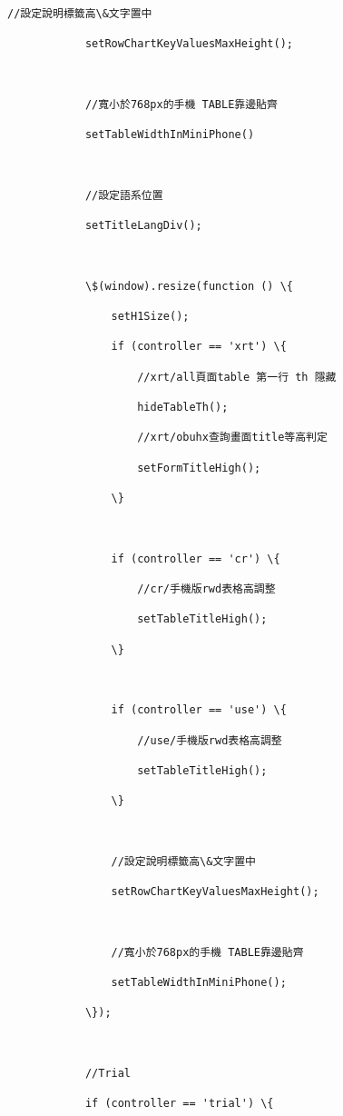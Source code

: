 \documentclass[11pt]{article}
\begin{document}
\begin{Verbatim}[commandchars=\\\{\}]
            //設定說明標籤高\&文字置中

            setRowChartKeyValuesMaxHeight();



            //寬小於768px的手機 TABLE靠邊貼齊

            setTableWidthInMiniPhone()



            //設定語系位置

            setTitleLangDiv();



            \$(window).resize(function () \{

                setH1Size();

                if (controller == 'xrt') \{

                    //xrt/all頁面table 第一行 th 隱藏

                    hideTableTh();

                    //xrt/obuhx查詢畫面title等高判定

                    setFormTitleHigh();

                \}



                if (controller == 'cr') \{

                    //cr/手機版rwd表格高調整

                    setTableTitleHigh();

                \}



                if (controller == 'use') \{

                    //use/手機版rwd表格高調整

                    setTableTitleHigh();

                \}



                //設定說明標籤高\&文字置中

                setRowChartKeyValuesMaxHeight();



                //寬小於768px的手機 TABLE靠邊貼齊

                setTableWidthInMiniPhone();

            \});



            //Trial

            if (controller == 'trial') \{


\end{Verbatim}
\end{document}
